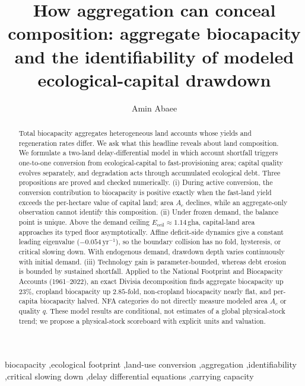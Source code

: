 \documentclass[preprint,12pt,authoryear]{elsarticle}
\newcommand{\Eceil}{E_{\mathrm{ceil}}}
\begin{document}
\begin{frontmatter}

\title{How aggregation can conceal composition: aggregate biocapacity and the identifiability of modeled ecological-capital drawdown}

\author[1]{Amin Abaee}

\begin{abstract}
\footnotesize
Total biocapacity aggregates heterogeneous land accounts whose yields and regeneration rates differ. We ask what this headline reveals about land composition. We formulate a two-land delay-differential model in which account shortfall triggers one-to-one conversion from ecological-capital to fast-provisioning area; capital quality evolves separately, and degradation acts through accumulated ecological debt. Three propositions are proved and checked numerically. (i) During active conversion, the conversion contribution to biocapacity is positive exactly when the fast-land yield exceeds the per-hectare value of capital land; area $A_c$ declines, while an aggregate-only observation cannot identify this composition. (ii) Under frozen demand, the balance point is unique. Above the demand ceiling $\Eceil\approx1.14$\,gha, capital-land area approaches its typed floor asymptotically. Affine deficit-side dynamics give a constant leading eigenvalue ($-0.054\,\mathrm{yr}^{-1}$), so the boundary collision has no fold, hysteresis, or critical slowing down. With endogenous demand, drawdown depth varies continuously with initial demand. (iii) Technology gain is parameter-bounded, whereas debt erosion is bounded by sustained shortfall. Applied to the National Footprint and Biocapacity Accounts (1961--2022), an exact Divisia decomposition finds aggregate biocapacity up $23\%$, cropland biocapacity up $2.85$-fold, non-cropland biocapacity nearly flat, and per-capita biocapacity halved. NFA categories do not directly measure modeled area $A_c$ or quality $q$. These model results are conditional, not estimates of a global physical-stock trend; we propose a physical-stock scoreboard with explicit units and valuation.
\end{abstract}

\begin{keyword}
\footnotesize
biocapacity \sep ecological footprint \sep land-use conversion \sep aggregation \sep identifiability \sep critical slowing down \sep delay differential equations \sep carrying capacity
\end{keyword}

\end{frontmatter}
\end{document}

